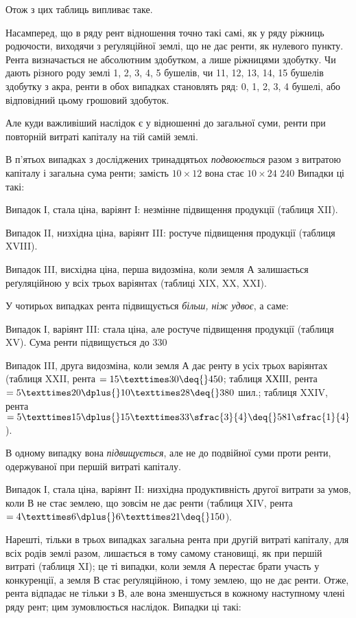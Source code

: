 
Отож з цих таблиць випливає таке.

Насамперед, що в ряду рент відношення точно такі самі, як у ряду ріжниць
родючости, виходячи з реґуляційної землі, що не дає ренти, як нулевого
пункту. Рента визначається не абсолютним здобутком, а лише ріжницями здобутку.
Чи дають різного роду землі 1, 2, 3, 4, 5 бушелів, чи 11, 12, 13, 14,
15 бушелів здобутку з акра, ренти в обох випадках становлять ряд: 0, 1, 2,
3, 4 бушелі, або відповідний цьому грошовий здобуток.

Але куди важливіший наслідок є у відношенні до загальної суми, ренти
при повторній витраті капіталу на тій самій землі.

В п’ятьох випадках з досліджених тринадцятьох \emph{подвоюється} разом з витратою
капіталу і загальна сума ренти; замість $10 × 12$ вона стає
$10 × 24$ \deq{} 240 Випадки ці такі:

Випадок І, стала ціна, варіянт І: незмінне підвищення продукції (таблиця
XII).

Випадок II, низхідна ціна, варіянт III: ростуче підвищення продукції
(таблиця XVIII).

Випадок III, висхідна ціна, перша видозміна, коли земля $А$ залишається
реґуляційною у всіх трьох варіянтах (таблиці XIX, XX, XXI).

У чотирьох випадках рента підвищується \emph{більш, ніж удвоє}, а саме:

Випадок І, варіянт III: стала ціна, але ростуче підвищення продукції
(таблиця XV). Сума ренти підвищується до 330

Випадок III, друга видозміна, коли земля $А$ дає ренту в усіх трьох варіянтах
(таблиця XXII, рента $= 15 × 30 \deq{} 450$; таблиця ХХІІІ, рента $= 5 ×
20 \dplus{} 10 × 28 \deq{} 380$ шил.; таблиця XXIV, рента
$= 5 × 15 \dplus{} 15 × 33\sfrac{3}{4} \deq{} 581\sfrac{1}{4}$).

В одному випадку вона \emph{підвищується}, але не до подвійної суми проти
ренти, одержуваної при першій витраті капіталу.

Випадок І, стала ціна, варіянт II: низхідна продуктивність другої витрати
за умов, коли $В$ не стає землею, що зовсім не дає ренти (таблиця XIV, рента
$= 4 × 6 \dplus{} 6 × 21 \deq{} 150$).

Нарешті, тільки в трьох випадках загальна рента при другій витраті
капіталу, для всіх родів землі разом, лишається в тому самому становищі, як при
першій витраті (таблиця XI); це ті випадки, коли земля $А$ перестає брати участь
у конкуренції, а земля $В$ стає реґуляційною, і тому землею, що не дає ренти.
Отже, рента відпадає не тільки з $В$, але вона зменшується в кожному наступному
члені ряду рент; цим зумовлюється наслідок. Випадки ці такі:

